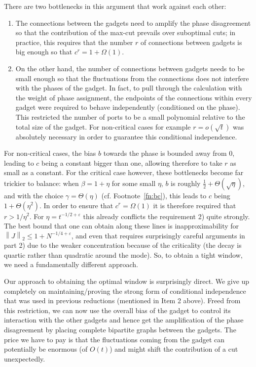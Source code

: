 \documentclass[11pt]{article}
\newcommand\norm[1]{\left\|{#1}\right\|}
\begin{document}
There are two bottlenecks in this argument that work against each other: \begin{enumerate}
    \item The connections between the gadgets need to amplify the phase disagreement so that the contribution of the max-cut prevails over  suboptimal cuts; in practice, this requires that the number $r$ of connections between gadgets is big enough so that $c^r=1+\Omega(1)$.
    \item On the other hand, the number of connections between gadgets needs to be small enough so that the fluctuations from the connections does not interfere with the phases of the gadget. In fact, to pull through the calculation with the weight of phase assignment, the endpoints of the connections within every gadget were required to behave  independently (conditioned on the phase). This restricted the number of ports to be a small polynomial relative to the total size of the gadget. For non-critical cases for example $r=o(\sqrt{t})$ was absolutely necessary in order to guarantee this conditional independence.
\end{enumerate} For non-critical cases, the bias $b$ towards the phase is bounded away from 0, leading to $c$ being a constant bigger than one, allowing therefore to take $r$ as small as a constant. For the critical case however, these bottlenecks become far trickier to balance: when $\beta= 1+\eta$ for some small $\eta$, $b$ is roughly $\tfrac{1}{2}+\Theta(\sqrt{\eta})$, and with the choice $\gamma=\Theta(\eta)$ (cf. Footnote~\ref{fn:bc}), this leads to $c$ being $1+\Theta(\eta^2)$. In order to ensure that $c^r=\Omega(1)$  it is therefore required that $r>1/\eta^2$. For $\eta=t^{-1/2+\varepsilon}$ this already conflicts the requirement 2) quite strongly. The best bound that one can obtain along these lines is inapproximability for $\norm{J}_2\leq 1+N^{-1/4+\varepsilon}$, and even that requires surprisingly careful arguments in part 2) due to the weaker concentration because of the criticality (the decay is quartic rather than quadratic around the mode). So, to obtain a tight window, we need a fundamentally different approach.

 Our approach to obtaining the optimal window is surprisingly direct. We give up completely on maintaining/proving the strong form of conditional independence that was used in previous reductions (mentioned in Item 2 above). Freed from this restriction, we can now use the overall bias of the gadget to control its interaction with the other gadgets and hence get the amplification of the phase disagreement by placing complete bipartite graphs between the gadgets. The price we have to pay is that the fluctuations coming from the gadget can potentially be enormous (of $O(t)$) and might shift the contribution of a cut unexpectedly. 
\end{document}

